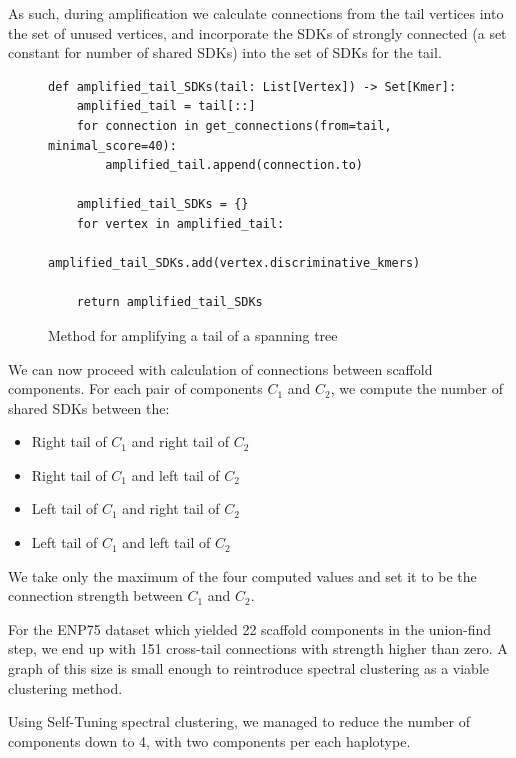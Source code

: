 As such, during amplification we calculate connections from the tail vertices into the set of unused vertices, and incorporate the SDKs of strongly connected (a set constant for number of shared SDKs) into the set of SDKs for the tail. 

\begin{figure}[H]
\lstset{language=Python}
\begin{lstlisting}[basicstyle=\small]
def amplified_tail_SDKs(tail: List[Vertex]) -> Set[Kmer]:
    amplified_tail = tail[::]
    for connection in get_connections(from=tail, minimal_score=40):
        amplified_tail.append(connection.to)

    amplified_tail_SDKs = {}
    for vertex in amplified_tail:
        amplified_tail_SDKs.add(vertex.discriminative_kmers)

    return amplified_tail_SDKs
\end{lstlisting}
\caption{Method for amplifying a tail of a spanning tree}
\label{fig:amplification}
\end{figure}

We can now proceed with calculation of connections between scaffold components. For each pair of components $C_1$ and $C_2$, we compute the number of shared SDKs between the:
\begin{itemize}
	\item{Right tail of $C_1$ and right tail of $C_2$}
	\item{Right tail of $C_1$ and left tail of $C_2$}
	\item{Left tail of $C_1$ and right tail of $C_2$}
	\item{Left tail of $C_1$ and left tail of $C_2$}
\end{itemize}
We take only the maximum of the four computed values and set it to be the connection strength between $C_1$ and $C_2$.

For the ENP75 dataset which yielded 22 scaffold components in the union-find step, we end up with 151 cross-tail connections with strength higher than zero. A graph of this size is small enough to reintroduce spectral clustering as a viable clustering method.

Using Self-Tuning spectral clustering\cite{clustering_lib}, we managed to reduce the number of components down to 4, with two components per each haplotype.

